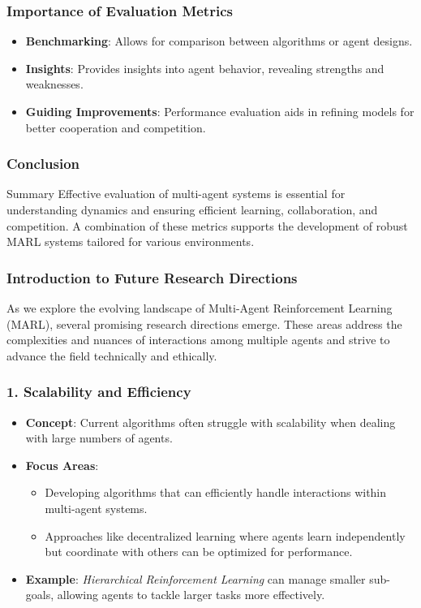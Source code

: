 \documentclass[aspectratio=169]{beamer}
\begin{document}
\begin{frame}[fragile]
    \frametitle{Importance of Evaluation Metrics}
    \begin{itemize}
        \item \textbf{Benchmarking}: Allows for comparison between algorithms or agent designs.
        \item \textbf{Insights}: Provides insights into agent behavior, revealing strengths and weaknesses.
        \item \textbf{Guiding Improvements}: Performance evaluation aids in refining models for better cooperation and competition.
    \end{itemize}
\end{frame}

\begin{frame}[fragile]
    \frametitle{Conclusion}
    \begin{block}{Summary}
        Effective evaluation of multi-agent systems is essential for understanding dynamics and ensuring efficient learning, collaboration, and competition. A combination of these metrics supports the development of robust MARL systems tailored for various environments.
    \end{block}
\end{frame}

\begin{frame}[fragile]
    \frametitle{Introduction to Future Research Directions}
    As we explore the evolving landscape of Multi-Agent Reinforcement Learning (MARL), several promising research directions emerge. These areas address the complexities and nuances of interactions among multiple agents and strive to advance the field technically and ethically.
\end{frame}

\begin{frame}[fragile]
    \frametitle{1. Scalability and Efficiency}
    \begin{itemize}
        \item \textbf{Concept}: Current algorithms often struggle with scalability when dealing with large numbers of agents.
        \item \textbf{Focus Areas}:
        \begin{itemize}
            \item Developing algorithms that can efficiently handle interactions within multi-agent systems.
            \item Approaches like decentralized learning where agents learn independently but coordinate with others can be optimized for performance.
        \end{itemize}
        \item \textbf{Example}: \textit{Hierarchical Reinforcement Learning} can manage smaller sub-goals, allowing agents to tackle larger tasks more effectively.
    \end{itemize}
\end{frame}
\end{document}
